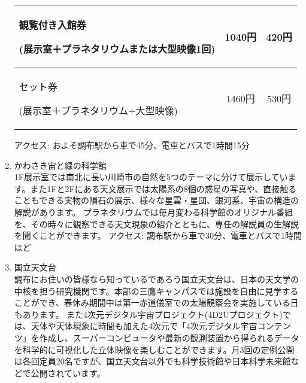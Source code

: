 \documentclass[../../super_nova_2023]{subfiles}
\begin{document}
\begin{enumerate}
{\begin{tabularx}{80mm}{X|c|c}
			      観覧付き入館券\par {\scriptsize (展示室＋プラネタリウムまたは大型映像1回)} & 1040円 & 420円   \\ \hline
			      セット券\par {\scriptsize (展示室＋プラネタリウム+大型映像)}        & 1460円 & 530円   \\
		      \end{tabularx}
	      }
	      \vspace{-\zw}アクセス: およそ調布駅から車で45分、電車とバスで1時間15分
	      \vspace{\zw}
	\item {}
	      かわさき宙と緑の科学館\mbox{}\\1F展示室では南北に長い川崎市の自然を5つのテーマに分けて展示しています。また1Fと2Fにある天文展示では太陽系の8個の惑星の写真や、直接触ることもできる実物の隕石の展示、様々な星雲・星団、銀河系、宇宙の構造の解説があります。
	      プラネタリウムでは毎月変わる科学館のオリジナル番組を、その時々に観察できる天文現象の紹介とともに、専任の解説員の生解説を聞くことができます。 
	      \vspace{-\zw}アクセス: 調布駅から車で30分、電車とバスで1時間ほど
	      \vspace{\zw}
	\item {}
	      国立天文台\mbox{}\\調布にお住いの皆様なら知っているであろう国立天文台は、日本の天文学の中核を担う研究機関です。本部の三鷹キャンパスでは施設を自由に見学することができ、春休み期間中は第一赤道儀室での太陽観察会を実施している日もあります。
	      また4次元デジタル宇宙プロジェクト(4D2Uプロジェクト)では、天体や天体現象に時間も加えた4次元で「4次元デジタル宇宙コンテンツ」を作成し、スーパーコンピュータや最新の観測装置から得られるデータを科学的に可視化した立体映像を楽しむことができます。月3回の定例公開は各回定員20名ですが、国立天文台以外でも科学技術館や日本科学未来館などで公開されています。

\end{enumerate}
\end{document}
